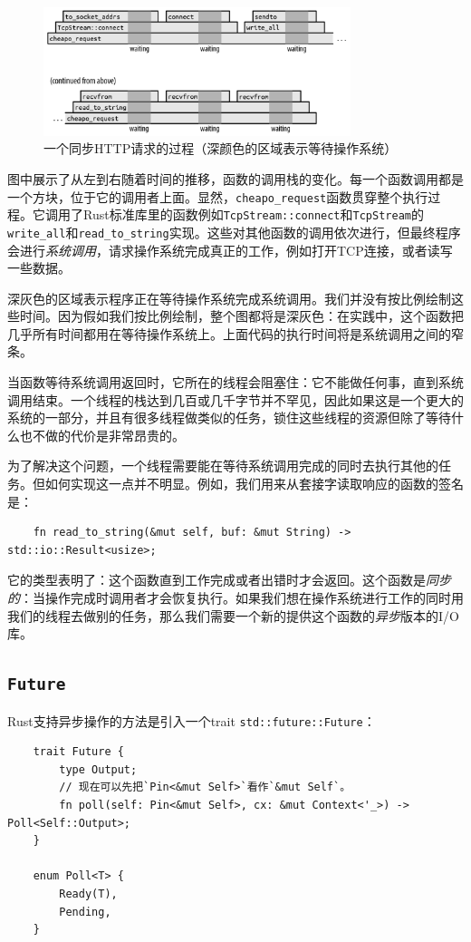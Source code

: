 \begin{figure}[htbp]
    \centering
    \includegraphics[width=0.8\textwidth]{../img/f20-1.png}
    \caption{一个同步HTTP请求的过程（深颜色的区域表示等待操作系统）}
    \label{f20-1}
\end{figure}

图中展示了从左到右随着时间的推移，函数的调用栈的变化。每一个函数调用都是一个方块，位于它的调用者上面。显然，\texttt{cheapo\_request}函数贯穿整个执行过程。它调用了Rust标准库里的函数例如\texttt{TcpStream::connect}和\texttt{TcpStream}的\texttt{write\_all}和\texttt{read\_to\_string}实现。这些对其他函数的调用依次进行，但最终程序会进行\emph{系统调用}，请求操作系统完成真正的工作，例如打开TCP连接，或者读写一些数据。

深灰色的区域表示程序正在等待操作系统完成系统调用。我们并没有按比例绘制这些时间。因为假如我们按比例绘制，整个图都将是深灰色：在实践中，这个函数把几乎所有时间都用在等待操作系统上。上面代码的执行时间将是系统调用之间的窄条。

当函数等待系统调用返回时，它所在的线程会阻塞住：它不能做任何事，直到系统调用结束。一个线程的栈达到几百或几千字节并不罕见，因此如果这是一个更大的系统的一部分，并且有很多线程做类似的任务，锁住这些线程的资源但除了等待什么也不做的代价是非常昂贵的。

为了解决这个问题，一个线程需要能在等待系统调用完成的同时去执行其他的任务。但如何实现这一点并不明显。例如，我们用来从套接字读取响应的函数的签名是：
\begin{verbatim}
    fn read_to_string(&mut self, buf: &mut String) -> std::io::Result<usize>;
\end{verbatim}

它的类型表明了：这个函数直到工作完成或者出错时才会返回。这个函数是\emph{同步的}：当操作完成时调用者才会恢复执行。如果我们想在操作系统进行工作的同时用我们的线程去做别的任务，那么我们需要一个新的提供这个函数的\emph{异步}版本的I/O库。

\subsection{\texttt{Future}}
Rust支持异步操作的方法是引入一个trait \texttt{std::future::Future}：
\begin{verbatim}
    trait Future {
        type Output;
        // 现在可以先把`Pin<&mut Self>`看作`&mut Self`。
        fn poll(self: Pin<&mut Self>, cx: &mut Context<'_>) -> Poll<Self::Output>;
    }

    enum Poll<T> {
        Ready(T),
        Pending,
    }
\end{verbatim}

